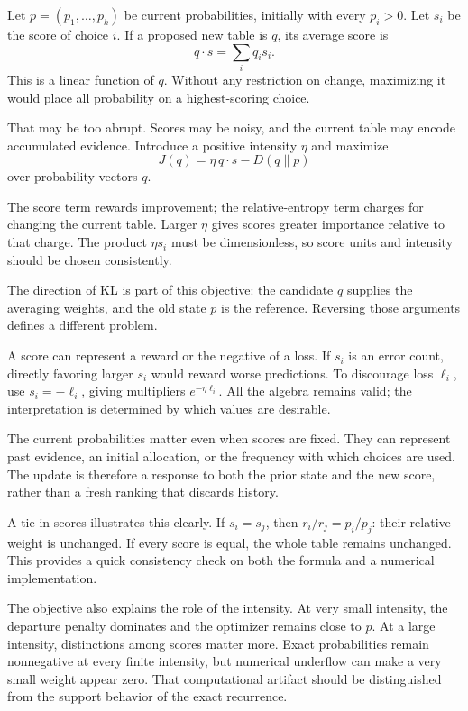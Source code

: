 \documentclass[11pt,oneside,openany]{book}
\theoremstyle{definition}
\theoremstyle{remark}
\numberwithin{equation}{chapter}
\begin{document}
Let \(p=(p_1,\ldots,p_k)\) be current probabilities, initially with every \(p_i>0\). Let \(s_i\) be the score of choice \(i\). If a proposed new table is \(q\), its average score is \[q\cdot s=\sum_i q_i s_i.\] This is a linear function of \(q\). Without any restriction on change, maximizing it would place all probability on a highest-scoring choice.

That may be too abrupt. Scores may be noisy, and the current table may encode accumulated evidence. Introduce a positive intensity \(\eta\) and maximize \[\boxed{J(q)=\eta\,q\cdot s-D(q\|p)}\] over probability vectors \(q\).

The score term rewards improvement; the relative-entropy term charges for changing the current table. Larger \(\eta\) gives scores greater importance relative to that charge. The product \(\eta s_i\) must be dimensionless, so score units and intensity should be chosen consistently.

The direction of KL is part of this objective: the candidate \(q\) supplies the averaging weights, and the old state \(p\) is the reference. Reversing those arguments defines a different problem.

A score can represent a reward or the negative of a loss. If \(s_i\) is an error count, directly favoring larger \(s_i\) would reward worse predictions. To discourage loss \(\ell_i\), use \(s_i=-\ell_i\), giving multipliers \(e^{-\eta\ell_i}\). All the algebra remains valid; the interpretation is determined by which values are desirable.

The current probabilities matter even when scores are fixed. They can represent past evidence, an initial allocation, or the frequency with which choices are used. The update is therefore a response to both the prior state and the new score, rather than a fresh ranking that discards history.

A tie in scores illustrates this clearly. If \(s_i=s_j\), then \(r_i/r_j=p_i/p_j\): their relative weight is unchanged. If every score is equal, the whole table remains unchanged. This provides a quick consistency check on both the formula and a numerical implementation.

The objective also explains the role of the intensity. At very small intensity, the departure penalty dominates and the optimizer remains close to \(p\). At a large intensity, distinctions among scores matter more. Exact probabilities remain nonnegative at every finite intensity, but numerical underflow can make a very small weight appear zero. That computational artifact should be distinguished from the support behavior of the exact recurrence.
\end{document}
